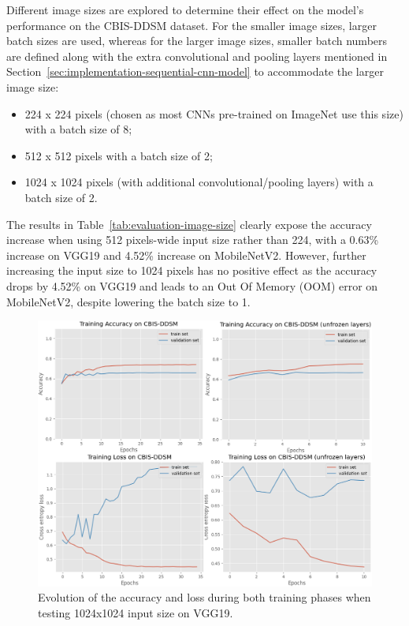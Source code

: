 Different image sizes are explored to determine their effect on the model's performance on the CBIS-DDSM dataset. For the smaller image sizes, larger batch sizes are used, whereas for the larger image sizes, smaller batch numbers are defined along with the extra convolutional and pooling layers mentioned in Section~\ref{sec:implementation-sequential-cnn-model} to accommodate the larger image size:
\begin{itemize}
    \item 224 x 224 pixels (chosen as most CNNs pre-trained on ImageNet use this size) with a batch size of 8;
    \item 512 x 512 pixels with a batch size of 2;
    \item 1024 x 1024 pixels (with additional convolutional/pooling layers) with a batch size of 2.
\end{itemize}

The results in Table~\ref{tab:evaluation-image-size} clearly expose the accuracy increase when using 512 pixels-wide input size rather than 224, with a 0.63\% increase on VGG19 and 4.52\% increase on MobileNetV2. However, further increasing the input size to 1024 pixels has no positive effect as the accuracy drops by 4.52\% on VGG19 and leads to an Out Of Memory (OOM) error on MobileNetV2, despite lowering the batch size to 1.



\begin{figure}[h]
\centerline{\includegraphics[width=1.2\textwidth]{figures/evaluation/image_size_experiment/training_summary.png}}
\caption{\label{fig:evaluation-image_size_experiment-training_summary}Evolution of the accuracy and loss during both training phases when testing 1024x1024 input size on VGG19.}
\end{figure}

